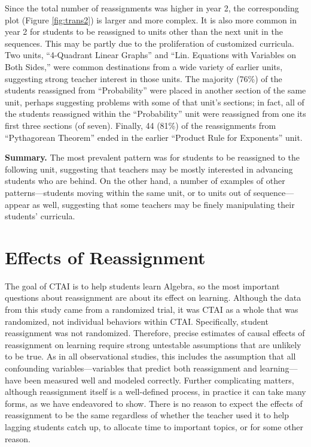 \documentclass[12pt]{article}\usepackage[]{graphicx}\usepackage[]{color}
\begin{document}
Since the total number of reassignments was higher in year 2, the corresponding plot (Figure \ref{fig:trans2}) is larger and more complex.
It is also more common in year 2 for students to be reassigned to units other than the next unit in the sequences.
This may be partly due to the proliferation of customized curricula.
Two units, ``4-Quadrant Linear Graphs'' and ``Lin. Equations with
Variables on Both Sides,'' were common destinations from a wide
variety of earlier units, suggesting strong teacher interest in those units.
The majority (76\%)
of the students reassigned from ``Probability'' were placed in another section of the same unit, perhaps suggesting problems with some of that unit's sections; in fact, all of the students reassigned within the ``Probability'' unit were reassigned from one its first three sections (of seven).
Finally, 44
(81\%) of the reassignments from ``Pythagorean Theorem'' ended in the earlier ``Product Rule for Exponents'' unit.

\textbf{Summary.} The most prevalent pattern was for students to be reassigned
to the following unit, suggesting that teachers may be mostly
interested in advancing students who are behind.
On the other hand, a number of examples of other patterns---students moving within the same unit, or to units out of sequence---appear as well, suggesting that some teachers may be finely manipulating their students' curricula.



\section{Effects of Reassignment}\label{sec:effects}
The goal of CTAI is to help students learn Algebra, so
the most important questions about reassignment are about its effect on learning.
Although the data from this study came from a randomized trial, it was
CTAI as a whole that was randomized, not individual behaviors within CTAI.
Specifically, student reassignment was not randomized.
Therefore, precise estimates of causal effects of reassignment on
learning require strong untestable assumptions that are unlikely to be
true.
As in all observational studies, this includes the assumption that all
confounding variables---variables that predict both reassignment and
learning---have been measured well and modeled correctly.
Further complicating matters, although reassignment itself is a
well-defined process, in practice it can take many forms, as we have
endeavored to show.
There is no reason to expect the effects of reassignment to be
the same regardless of whether the teacher used it to help lagging
students catch up, to allocate time to important topics, or for some
other reason.
\end{document}
